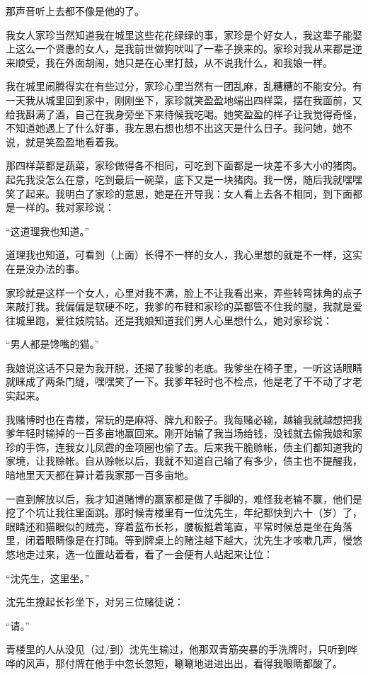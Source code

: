 \documentclass[12pt,UTF8]{ctexbook}
\begin{document}
那声音听上去都不像是他的了。

我女人家珍当然知道我在城里这些花花绿绿的事，家珍是个好女人，我这辈子能娶上这么一个贤惠的女人，是我前世做狗吠叫了一辈子换来的。家珍对我从来都是逆来顺受，我在外面胡闹，她只是在心里打鼓，从不说我什么，和我娘一样。

我在城里闹腾得实在有些过分，家珍心里当然有一团乱麻，乱糟糟的不能安分。有一天我从城里回到家中，刚刚坐下，家珍就笑盈盈地端出四样菜，摆在我面前，又给我斟满了酒，自己在我身旁坐下来待候我吃喝。她笑盈盈的样子让我觉得奇怪，不知道她遇上了什么好事，我左思右想也想不出这天是什么日子。我问她，她不说，就是笑盈盈地看着我。

那四样菜都是蔬菜，家珍做得各不相同，可吃到下面都是一块差不多大小的猪肉。起先我没怎么在意，吃到最后一碗菜，底下又是一块猪肉。我一愣，随后我就嘿嘿笑了起来。我明白了家珍的意思，她是在开导我：女人看上去各不相同，到下面都是一样的。我对家珍说：

“这道理我也知道。”

道理我也知道，可看到（上面）长得不一样的女人，我心里想的就是不一样，这实在是没办法的事。

家珍就是这样一个女人，心里对我不满，脸上不让我看出来，弄些转弯抹角的点子来敲打我。我偏偏是软硬不吃，我爹的布鞋和家珍的菜都管不住我的腿，我就是爱往城里跑，爱往妓院钻。还是我娘知道我们男人心里想什么，她对家珍说：

“男人都是馋嘴的猫。”

我娘说这话不只是为我开脱，还揭了我爹的老底。我爹坐在椅子里，一听这话眼睛就眯成了两条门缝，嘿嘿笑了一下。我爹年轻时也不检点，他是老了干不动了才老实起来。

我赌博时也在青楼，常玩的是麻将、牌九和骰子。我每赌必输，越输我就越想把我爹年轻时输掉的一百多亩地赢回来。刚开始输了我当场给钱，没钱就去偷我娘和家珍的手饰，连我女儿凤霞的金项圈也偷了去。后来我干脆赊帐，债主们都知道我的家境，让我赊帐。自从赊帐以后，我就不知道自己输了有多少，债主也不提醒我，暗地里天天都在算计着我家那一百多亩地。

一直到解放以后，我才知道赌博的赢家都是做了手脚的，难怪我老输不赢，他们是挖了个坑让我往里面跳。那时候青楼里有一位沈先生，年纪都快到六十（岁）了，眼睛还和猫眼似的贼亮，穿着蓝布长衫，腰板挺着笔直，平常时候总是坐在角落里，闭着眼睛像是在打盹。等到牌桌上的赌注越下越大，沈先生才咳嗽几声，慢悠悠地走过来，选一位置站着看，看了一会便有人站起来让位：

“沈先生，这里坐。”

沈先生撩起长衫坐下，对另三位赌徒说：

“请。”

青楼里的人从没见（过/到）沈先生输过，他那双青筋突暴的手洗牌时，只听到哗哗的风声，那付牌在他手中忽长忽短，唰唰地进进出出，看得我眼睛都酸了。
\end{document}
